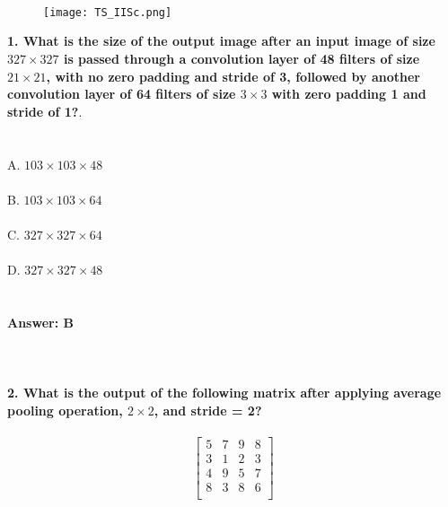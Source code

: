 \documentclass[prl,twocolumn,showpacs,preprintnumbers,superscriptaddress]{revtex4}
\theoremstyle{plain}
\theoremstyle{definition}
\begin{document}
\begin{widetext}
\\
\\
\\

\begin{wrapfigure}
\centering
\end{wrapfigure}
\begin{figure}[h!]
 \begin{right}
  \hfill\texttt{[image: TS\_IISc.png]}
 \end{right}
\end{figure}
\noindent\textbf{1. What is the size of the output image after an input image of size $327 \times 327$ is passed through a convolution layer of 48 filters of size $21 \times 21$, with no zero padding and stride of 3, followed by another convolution layer of 64 filters of size $3 \times 3$ with zero padding 1 and stride of 1?}. 
\\
\\
\\
A. $103 \times 103 \times 48$
\\
\\
B. $103 \times 103 \times 64$ 
\\
\\
C. $327 \times 327 \times 64$
\\
\\
D. $327 \times 327 \times 48$
\\
\\
\\
\textbf{Answer: B}
\\
\\
\\
\\
\textbf{2. What is the output of the following matrix after applying average pooling operation, $2 \times 2$, and stride = 2?}
\\
\\
\[ 
\begin{bmatrix}    5 & 7 & 9 & 8 \\     3 & 1 & 2 & 3\\ 4 & 9 & 5 & 7 \\ 8 & 3 & 8 & 6 \\ \end{bmatrix}
\]
\end{widetext}
\end{document}
